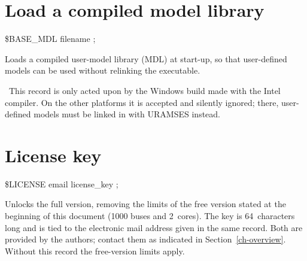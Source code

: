 \section{Load a compiled model library}

 \$BASE\_MDL filename ;

Loads a compiled user-model library (MDL) at start-up, so that user-defined
models can be used without relinking the executable.

\faHandPointRight~This record is only acted upon by the Windows build made with
the Intel compiler. On the other platforms it is accepted and silently ignored;
there, user-defined models must be linked in with URAMSES instead.


\section{License key}

 \$LICENSE email license\_key ;

Unlocks the full version, removing the limits of the free version stated at the
beginning of this document (1000 buses and 2~cores). The key is 64~characters
long and is tied to the electronic mail address given in the same record. Both
are provided by the authors; contact them as indicated in Section~\ref{ch-overview}.
Without this record the free-version limits apply.